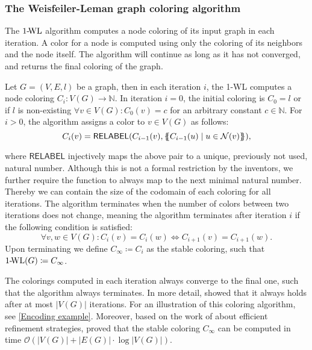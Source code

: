 \subsubsection{The Weisfeiler-Leman graph coloring algorithm}
The $\wl$ algorithm computes a node coloring of its input graph in each iteration. A color for a node is computed using only the coloring of its neighbors and the node itself. The algorithm will continue as long as it has not converged, and returns the final coloring of the graph.

\begin{definition}[$\wl$ Algorithm]
Let $G = (V, E, l)$ be a graph, then in each iteration $i$, the 1-WL computes a node coloring $C_i: V(G) \rightarrow \mathbb{N}$. In iteration $i=0$, the initial coloring is $C_0 = l$ or if $l$ is non-existing $\forall v \in V(G): C_0(v) = c$ for an arbitrary constant $c \in \mathbb{N}$. For $i > 0$, the algorithm assigns a color to $v \in V(G)$ as follows:
\begin{equation*}
C_i (v) = \textsf{RELABEL}(C_{i-1}(v), \{\!\!\{ C_{i-1}(u) \mid u \in \mathcal{N}(v) \}\!\!\}),
\end{equation*}

\noindent where $\textsf{RELABEL}$ injectively maps the above pair to a unique, previously not used, natural number. Although this is not a formal restriction by the inventors, we further require the function to always map to the next minimal natural number. Thereby we can contain the size of the codomain of each coloring for all iterations. The algorithm terminates when the number of colors between two iterations does not change, meaning the algorithm terminates after iteration $i$ if the following condition is satisfied:
\begin{equation*}
\forall v,w \in V(G):  C_i(v) = C_i(w) \iff C_{i+1}(v) = C_{i+1}(w).
\end{equation*}
Upon terminating we define $C_{\infty} \coloneqq C_i$ as the stable coloring, such that $\text{1-\!WL}(G) \coloneqq C_\infty$.
\end{definition}


The colorings computed in each iteration always converge to the final one, such that the algorithm always terminates. In more detail, \cite{Gro2017} showed that it always holds after at most $|V(G)|$ iterations.
For an illustration of this coloring algorithm, see \autoref{Encoding example}. Moreover, based on the work of \cite{Pai+87} about efficient refinement strategies, \cite{Car+82} proved that the stable coloring $C_\infty$ can be computed in time $\mathcal{O}(| V(G) | + |E(G)| \cdot \log | V(G) |)$.

